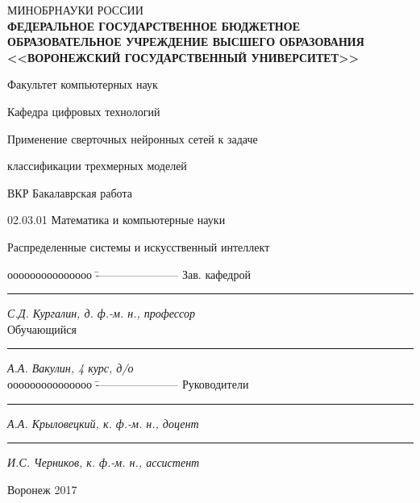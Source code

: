 \documentclass[14pt]{article}
\numberwithin{figure}{section}
\numberwithin{equation}{section}
\begin{document}
\begin{titlepage}

\thispagestyle{empty}
\center
\textsc{МИНОБРНАУКИ РОССИИ}\\
\textbf{ФЕДЕРАЛЬНОЕ ГОСУДАРСТВЕННОЕ БЮДЖЕТНОЕ ОБРАЗОВАТЕЛЬНОЕ УЧРЕЖДЕНИЕ ВЫСШЕГО ОБРАЗОВАНИЯ\\<<ВОРОНЕЖСКИЙ ГОСУДАРСТВЕННЫЙ УНИВЕРСИТЕТ>>}

\vspace{0.3cm}

\centerline{Факультет компьютерных наук}
\centerline{Кафедра цифровых технологий}

\vspace{1cm}

\centerline{Применение сверточных нейронных сетей к задаче }
\centerline{классификации трехмерных моделей}

\vspace{1cm}

\centerline{ВКР Бакалаврская работа}
\centerline{02.03.01 Математика и компьютерные науки}
\centerline{Распределенные системы и искусственный интеллект}

\vfill
{}
\begin{tabbing}
ооооооооооооооо	\=	----------------------	\kill
Зав. кафедрой	\> 	\rule[0mm]{4cm}{0,3mm}	\textit{С.Д. Кургалин, д. ф.-м. н., профессор} \\
Обучающийся 	\> 	\rule[0mm]{4cm}{0,3mm}	\textit{А.А. Вакулин, 4 курс, д/о}             \\
ооооооооооооооо	\=	----------------------	\kill
Руководители	\> 	\rule[0mm]{4cm}{0,3mm}  \textit{А.А. Крыловецкий, к. ф.-м. н., доцент} \\
				\> 	\rule[0mm]{4cm}{0,3mm}  \textit{И.С. Черников, к. ф.-м. н., ассистент}
\end{tabbing}

\vfill

\centerline{Воронеж 2017}
\clearpage
\end{titlepage}

\end{document}
